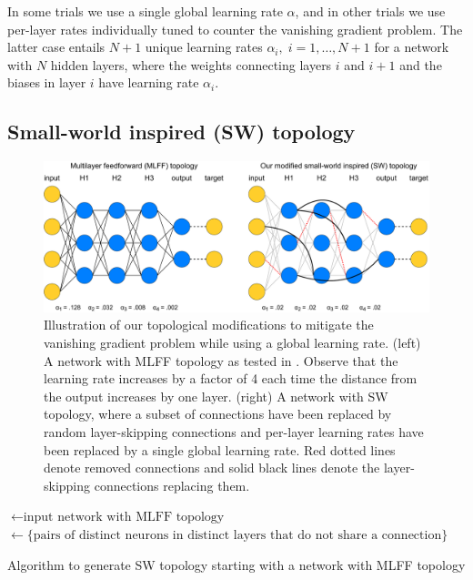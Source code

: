 \documentclass[utf8]{frontiersSCNS}
\begin{document}
In some trials we use a single global learning rate $\alpha$, and in other trials we use per-layer rates individually tuned to counter the vanishing gradient problem. The latter case entails $N+1$ unique learning rates $\alpha_i,\;i=1,\hdots,N+1$ for a network with $N$ hidden layers, where the weights connecting layers $i$ and $i+1$ and the biases in layer $i$ have learning rate $\alpha_i$.

\subsection{Small-world inspired (SW) topology}
\label{sec:our_topology}

\begin{figure}
	\centering
	\includegraphics[width=6in]{figures/diagram.pdf}
	\caption{Illustration of our topological modifications to mitigate the vanishing gradient problem while using a global learning rate. (left) A network with MLFF topology as tested in \citep{scellier17}. Observe that the learning rate increases by a factor of 4 each time the distance from the output increases by one layer. (right) A network with SW topology, where a subset of connections have been replaced by random layer-skipping connections and per-layer learning rates have been replaced by a single global learning rate. Red dotted lines denote removed connections and solid black lines denote the layer-skipping connections replacing them.}
	\label{fig:diagram}
\end{figure}


\begin{algorithm}
\DontPrintSemicolon
{}
\BlankLine
\Network$\leftarrow\text{input network with MLFF topology}$\;
\PotConn$\leftarrow\{\text{pairs of distinct neurons in distinct layers that do not share a connection}\}$\;
\BlankLine
{}
\caption{Algorithm to generate SW topology starting with a network with MLFF topology}\label{alg:ourtop}
\end{algorithm}
\end{document}

